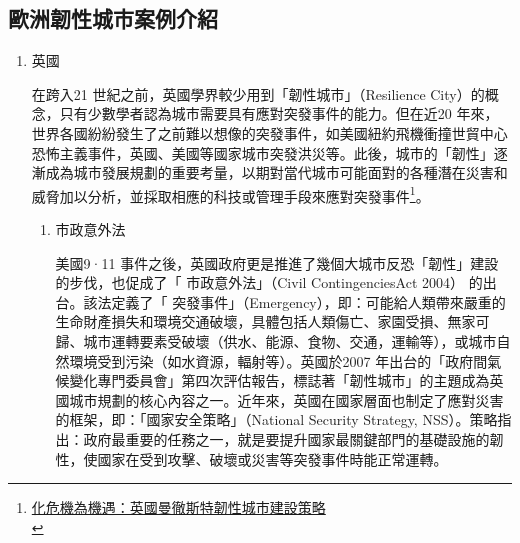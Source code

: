 \documentclass[a4paper,12pt]{article}
\begin{document}
\subsection{歐洲韌性城市案例介紹}
\label{sec:org448b69d}
\begin{enumerate}
\item 英國
\label{sec:orgde652e0}

在跨入21 世紀之前，英國學界較少用到「韌性城市」（Resilience City）的概念，只有少數學者認為城市需要具有應對突發事件的能力。但在近20 年來，世界各國紛紛發生了之前難以想像的突發事件，如美國紐約飛機衝撞世貿中心恐怖主義事件，英國、美國等國家城市突發洪災等。此後，城市的「韌性」逐漸成為城市發展規劃的重要考量，以期對當代城市可能面對的各種潛在災害和威脅加以分析，並採取相應的科技或管理手段來應對突發事件\footnote{\href{https://kknews.cc/zh-tw/world/jkga9bl.html}{化危機為機遇：英國曼徹斯特韌性城市建設策略}\\\label{org71ccbaf}}。\\

\begin{enumerate}
\item 市政意外法
\label{sec:org1fa2e50}

美國9·11 事件之後，英國政府更是推進了幾個大城市反恐「韌性」建設的步伐，也促成了「 市政意外法」（Civil ContingenciesAct 2004） 的出台。該法定義了「 突發事件」（Emergency），即：可能給人類帶來嚴重的生命財產損失和環境交通破壞，具體包括人類傷亡、家園受損、無家可歸、城市運轉要素受破壞（供水、能源、食物、交通，運輸等），或城市自然環境受到污染（如水資源，輻射等）。英國於2007 年出台的「政府間氣候變化專門委員會」第四次評估報告，標誌著「韌性城市」的主題成為英國城市規劃的核心內容之一。近年來，英國在國家層面也制定了應對災害的框架，即：「國家安全策略」（National Security Strategy, NSS）。策略指出：政府最重要的任務之一，就是要提升國家最關鍵部門的基礎設施的韌性，使國家在受到攻擊、破壞或災害等突發事件時能正常運轉。\\


\end{enumerate}
\end{enumerate}
\end{document}
